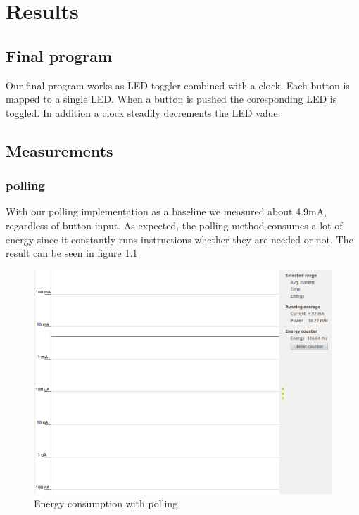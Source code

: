 \chapter{Results}

\section{Final program}
Our final program works as LED toggler combined with a clock. Each button is mapped to a single LED. When a button is pushed the coresponding LED is toggled. In addition a clock steadily decrements the LED value.

\section{Measurements}

\subsection{polling}
With our polling implementation as a baseline we measured about 4.9mA, regardless of button input. As expected, the polling method consumes a lot of energy since it constantly runs instructions whether they are needed or not. The result can be seen in figure \ref{fig:PerformancePolling}

\begin{figure}[ht]
 \centering
 \includegraphics[width=\textwidth]{images/performance_with_polling.png}
 \caption{Energy consumption with polling}
 \label{fig:PerformancePolling}
\end{figure}

